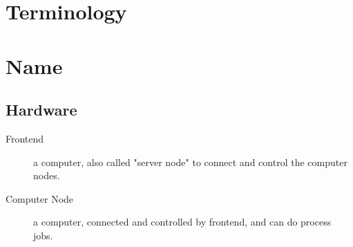 \section{Terminology}

\section{Name}
\subsection{Hardware}
\begin{description}
\item[Frontend] a computer, also called "server node" to connect and control the computer nodes.
\item[Computer Node] a computer, connected and controlled by frontend, and can do process jobs.
\end{description}
